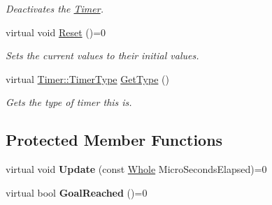 \begin{DoxyCompactItemize}
\begin{DoxyCompactList}\small\item\em Deactivates the \hyperlink{classphys_1_1Timer}{Timer}. \item\end{DoxyCompactList}\item 
\hypertarget{classphys_1_1Timer_a6010a6dab70b542c3e9d5a09caa422f7}{
virtual void \hyperlink{classphys_1_1Timer_a6010a6dab70b542c3e9d5a09caa422f7}{Reset} ()=0}
\label{d3/d83/classphys_1_1Timer_a6010a6dab70b542c3e9d5a09caa422f7}

\begin{DoxyCompactList}\small\item\em Sets the current values to their initial values. \item\end{DoxyCompactList}\item 
virtual \hyperlink{classphys_1_1Timer_aacbbca9cc5543fc8414de59cd085c1c1}{Timer::TimerType} \hyperlink{classphys_1_1Timer_af0eaa87bf3074047db36ba1c6fd33c70}{GetType} ()
\begin{DoxyCompactList}\small\item\em Gets the type of timer this is. \item\end{DoxyCompactList}\end{DoxyCompactItemize}
\subsection*{Protected Member Functions}
\begin{DoxyCompactItemize}
\item 
\hypertarget{classphys_1_1Timer_a45d7e290f9cb8c03f2376e48ff794f24}{
virtual void {\bfseries Update} (const \hyperlink{namespacephys_a460f6bc24c8dd347b05e0366ae34f34a}{Whole} MicroSecondsElapsed)=0}
\label{d3/d83/classphys_1_1Timer_a45d7e290f9cb8c03f2376e48ff794f24}

\item 
\hypertarget{classphys_1_1Timer_a636d546064abe43b1c549efaca777613}{
virtual bool {\bfseries GoalReached} ()=0}
\label{d3/d83/classphys_1_1Timer_a636d546064abe43b1c549efaca777613}

\end{DoxyCompactItemize}
